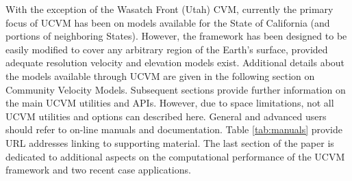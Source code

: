 With the exception of the Wasatch Front (Utah) CVM, currently the primary focus of UCVM has been on models available for the State of California (and portions of neighboring States). However, the framework has been designed to be easily modified to cover any arbitrary region of the Earth's surface, provided adequate resolution velocity and elevation models exist. Additional details about the models available through UCVM are given in the following section on Community Velocity Models. Subsequent sections provide further information on the main UCVM utilities and APIs. However, due to space limitations, not all UCVM utilities and options can described here. General and advanced users should refer to on-line manuals and documentation. Table \ref{tab:manuals} provide URL addresses linking to supporting material. The last section of the paper is dedicated to additional aspects on the computational performance of the UCVM framework and two recent case applications. 










